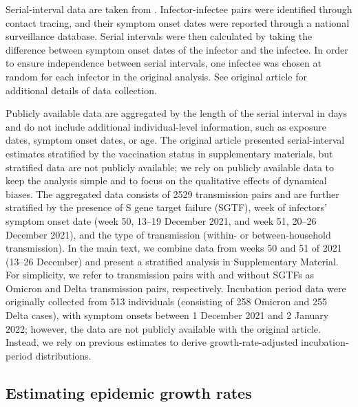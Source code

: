 \documentclass[12pt]{article}
\begin{document}
Serial-interval data are taken from \cite{backer2021omicron}.
Infector-infectee pairs were identified through contact tracing, and their symptom onset dates were reported through a national surveillance database.
Serial intervals were then calculated by taking the difference between symptom onset dates of the infector and the infectee.
In order to ensure independence between serial intervals, one infectee was chosen at random for each infector in the original analysis.
See original article for additional details of data collection.

Publicly available data are aggregated by the length of the serial interval in days and do not include additional individual-level information, such as exposure dates, symptom onset dates, or age.
The original article presented serial-interval estimates stratified by the vaccination status in supplementary materials, but stratified data are not publicly available; we rely on publicly available data to keep the analysis simple and to focus on the qualitative effects of dynamical biases.
The aggregated data consists of 2529 transmission pairs and are further stratified by the presence of S gene target failure (SGTF), week of infectors' symptom onset date (week 50, 13--19 December 2021, and week 51, 20--26 December 2021), and the type of transmission (within- or between-household transmission).
In the main text, we combine data from weeks 50 and 51 of 2021 (13--26 December) and present a stratified analysis in Supplementary Material.
For simplicity, we refer to transmission pairs with and without SGTFs as Omicron and Delta transmission pairs, respectively.
Incubation period data were originally collected from 513 individuals (consisting of 258 Omicron and 255 Delta cases), with symptom onsets between 1 December 2021 and 2 January 2022;
however, the data are not publicly available with the original article. 
Instead, we rely on previous estimates \cite{backer2021omicron} to derive growth-rate-adjusted incubation-period distributions.

\subsection{Estimating epidemic growth rates}
\end{document}
